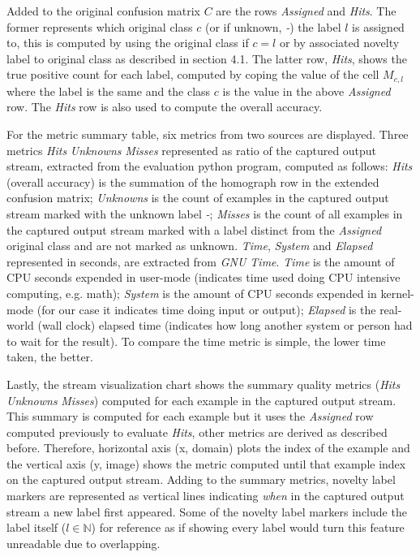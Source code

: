 \documentclass[conference]{IEEEtran}
\begin{document}
Added to the original confusion matrix $C$ are the rows \emph{Assigned} and
\emph{Hits}.
The former represents which original class $c$ (or if unknown, \emph{-}) the
label $l$ is assigned to, this is computed by using the original class if
$c = l$ or by associated novelty label to original class as described in
\cite{DeFaria2015} section 4.1.
The latter row, \emph{Hits}, shows the true positive count for each label,
computed by coping the value of the cell $M_{c, l}$ where the label is the same
and the class $c$ is the value in the above \emph{Assigned} row.
The \emph{Hits} row is also used to compute the overall accuracy.

For the metric summary table, six metrics from two sources are displayed.
Three metrics \emph{Hits} \emph{Unknowns} \emph{Misses} represented as ratio of the
captured output stream, extracted from the evaluation python
program, computed as follows:
\emph{Hits} (overall accuracy) is the summation of the homograph row in the
extended confusion matrix;
\emph{Unknowns} is the count of examples in the captured output stream marked
with the unknown label \emph{-};
\emph{Misses} is the count of all examples in the captured output stream marked
with a label distinct from the \emph{Assigned} original class and are not marked
as unknown.
\emph{Time}, \emph{System} and \emph{Elapsed} represented in seconds,
are extracted from \emph{GNU Time}.
\emph{Time} is the amount of CPU seconds expended in user-mode
(indicates time used doing CPU intensive computing, e.g. math);
\emph{System} is the amount of CPU seconds expended in kernel-mode
(for our case it indicates time doing input or output);
\emph{Elapsed} is the real-world (wall clock) elapsed time
(indicates how long another system or person had to wait for the result).
To compare the time metric is simple, the lower time taken, the better.

Lastly, the stream visualization chart shows the summary quality metrics
(\emph{Hits} \emph{Unknowns} \emph{Misses})
computed for each example in the captured output stream.
This summary is computed for each example but it uses the \emph{Assigned} row
computed previously to evaluate \emph{Hits}, other metrics are derived as
described before.
Therefore, horizontal axis (x, domain) plots the index of the example and the
vertical axis (y, image) shows the metric computed until that example index on the captured
output stream.
Adding to the summary metrics, novelty label markers are represented as vertical
lines indicating \emph{when} in the captured output stream a new label first
appeared.
Some of the novelty label markers include the label itself ($l \in \mathbb{N}$)
for reference as if showing every label would turn this feature unreadable due
to overlapping.
\end{document}
